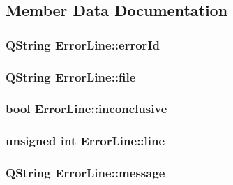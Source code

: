 \subsection{Member Data Documentation}
\hypertarget{class_error_line_a5c8472d2abe6f93e943a1d82db948259}{
\subsubsection[{error\-Id}]{\setlength{\rightskip}{0pt plus 5cm}Q\-String Error\-Line\-::error\-Id}}\label{class_error_line_a5c8472d2abe6f93e943a1d82db948259}
\hypertarget{class_error_line_aaba8780c450ea7e40048a9e0160d9a25}{
\subsubsection[{file}]{\setlength{\rightskip}{0pt plus 5cm}Q\-String Error\-Line\-::file}}\label{class_error_line_aaba8780c450ea7e40048a9e0160d9a25}
\hypertarget{class_error_line_a05e996d063dccecc12e323b666d2bcd9}{
\subsubsection[{inconclusive}]{\setlength{\rightskip}{0pt plus 5cm}bool Error\-Line\-::inconclusive}}\label{class_error_line_a05e996d063dccecc12e323b666d2bcd9}
\hypertarget{class_error_line_a6d8990856137262870abaf23f024fa9f}{
\subsubsection[{line}]{\setlength{\rightskip}{0pt plus 5cm}unsigned int Error\-Line\-::line}}\label{class_error_line_a6d8990856137262870abaf23f024fa9f}
\hypertarget{class_error_line_ad45357a4430d5dfea406027938698802}{
\subsubsection[{message}]{\setlength{\rightskip}{0pt plus 5cm}Q\-String Error\-Line\-::message}}\label{class_error_line_ad45357a4430d5dfea406027938698802}
